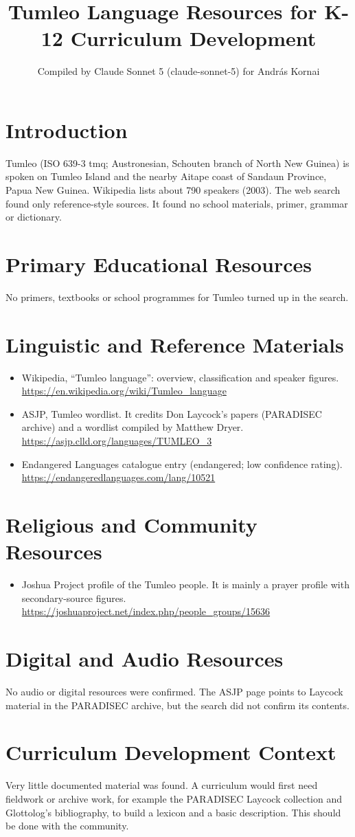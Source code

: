 \documentclass[12pt]{article}
\title{Tumleo Language Resources for K-12 Curriculum Development}
\author{Compiled by Claude Sonnet 5 (claude-sonnet-5) for Andr\'as Kornai}
\date{}
\begin{document}
\maketitle

\section{Introduction}
Tumleo (ISO 639-3 tmq; Austronesian, Schouten branch of North New Guinea) is spoken on Tumleo Island and the nearby Aitape coast of Sandaun Province, Papua New Guinea. Wikipedia lists about 790 speakers (2003). The web search found only reference-style sources. It found no school materials, primer, grammar or dictionary.

\section{Primary Educational Resources}
No primers, textbooks or school programmes for Tumleo turned up in the search.

\section{Linguistic and Reference Materials}
\begin{itemize}
\item Wikipedia, ``Tumleo language'': overview, classification and speaker figures. \url{https://en.wikipedia.org/wiki/Tumleo_language}
\item ASJP, Tumleo wordlist. It credits Don Laycock's papers (PARADISEC archive) and a wordlist compiled by Matthew Dryer. \url{https://asjp.clld.org/languages/TUMLEO_3}
\item Endangered Languages catalogue entry (endangered; low confidence rating). \url{https://endangeredlanguages.com/lang/10521}
\end{itemize}

\section{Religious and Community Resources}
\begin{itemize}
\item Joshua Project profile of the Tumleo people. It is mainly a prayer profile with secondary-source figures. \url{https://joshuaproject.net/index.php/people_groups/15636}
\end{itemize}

\section{Digital and Audio Resources}
No audio or digital resources were confirmed. The ASJP page points to Laycock material in the PARADISEC archive, but the search did not confirm its contents.

\section{Curriculum Development Context}
Very little documented material was found. A curriculum would first need fieldwork or archive work, for example the PARADISEC Laycock collection and Glottolog's bibliography, to build a lexicon and a basic description. This should be done with the community.
\end{document}
